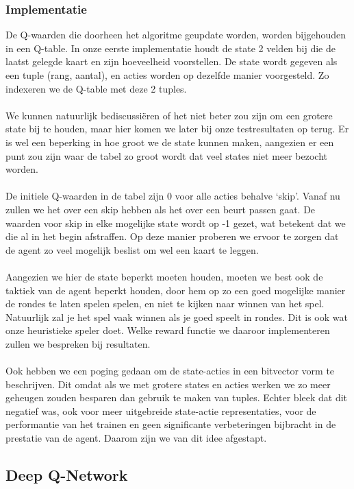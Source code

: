 \documentclass[11pt]{article}
\begin{document}
\subsubsection{Implementatie}
De Q-waarden die doorheen het algoritme geupdate worden, worden bijgehouden in een Q-table. In onze eerste implementatie houdt de state 2 velden bij die de laatst gelegde kaart en zijn hoeveelheid voorstellen. De state wordt gegeven als een tuple (rang, aantal), en acties worden op dezelfde manier voorgesteld. Zo indexeren we de Q-table met deze 2 tuples. \\\\
We kunnen natuurlijk bediscussiëren of het niet beter zou zijn om een grotere state bij te houden, maar hier komen we later bij onze testresultaten op terug. Er is wel een beperking in hoe groot we de state kunnen maken, aangezien er een punt zou zijn waar de tabel zo groot wordt dat veel states niet meer bezocht worden. \\\\
De initiele Q-waarden in de tabel zijn 0 voor alle acties behalve `skip'. Vanaf nu zullen we het over een skip hebben als het over een beurt passen gaat. De waarden voor skip in elke mogelijke state wordt op -1 gezet, wat betekent dat we die al in het begin afstraffen. Op deze manier proberen we ervoor te zorgen dat de agent zo veel mogelijk beslist om wel een kaart te leggen. \\\\
Aangezien we hier de state beperkt moeten houden, moeten we best ook de taktiek van de agent beperkt houden, door hem op zo een goed mogelijke manier de rondes te laten spelen spelen, en niet te kijken naar winnen van het spel. Natuurlijk zal je het spel vaak winnen als je goed speelt in rondes. Dit is ook wat onze heuristieke speler doet. Welke reward functie we daaroor implementeren zullen we bespreken bij resultaten.\\\\
Ook hebben we een poging gedaan om de state-acties in een bitvector vorm te beschrijven. Dit omdat als we met grotere states en acties werken we zo meer geheugen zouden besparen dan gebruik te maken van tuples. Echter bleek dat dit negatief was, ook voor meer uitgebreide state-actie representaties, voor de performantie van het trainen en geen significante verbeteringen bijbracht in de prestatie van de agent. Daarom zijn we van dit idee afgestapt.\\


\subsection{Deep Q-Network}
\end{document}
